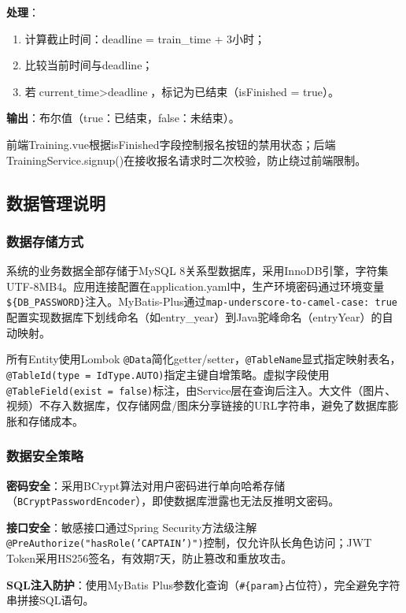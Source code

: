 \documentclass[12pt,a4paper]{ctexart}
\begin{document}
\textbf{处理}：
\begin{enumerate}[label=(\arabic*)]
\item 计算截止时间：deadline = train\_time + 3小时；
\item 比较当前时间与deadline；
\item 若$\text{current\_time} > \text{deadline}$，标记为已结束（isFinished = true）。
\end{enumerate}

\textbf{输出}：布尔值（true：已结束，false：未结束）。

前端Training.vue根据isFinished字段控制报名按钮的禁用状态；后端TrainingService.signup()在接收报名请求时二次校验，防止绕过前端限制。

\subsection{数据管理说明}

\subsubsection{数据存储方式}

系统的业务数据全部存储于MySQL 8关系型数据库，采用InnoDB引擎，字符集UTF-8MB4。应用连接配置在application.yaml中，生产环境密码通过环境变量\texttt{\$\{DB\_PASSWORD\}}注入。MyBatis-Plus通过\texttt{map-underscore-to-camel-case: true}配置实现数据库下划线命名（如entry\_year）到Java驼峰命名（entryYear）的自动映射。

所有Entity使用Lombok \texttt{@Data}简化getter/setter，\texttt{@TableName}显式指定映射表名，\texttt{@TableId(type = IdType.AUTO)}指定主键自增策略。虚拟字段使用\texttt{@TableField(exist = false)}标注，由Service层在查询后注入。大文件（图片、视频）不存入数据库，仅存储网盘/图床分享链接的URL字符串，避免了数据库膨胀和存储成本。

\subsubsection{数据安全策略}

\textbf{密码安全}：采用BCrypt算法对用户密码进行单向哈希存储（\texttt{BCryptPasswordEncoder}），即使数据库泄露也无法反推明文密码。

\textbf{接口安全}：敏感接口通过Spring Security方法级注解\texttt{@PreAuthorize("hasRole('CAPTAIN')")}控制，仅允许队长角色访问；JWT Token采用HS256签名，有效期7天，防止篡改和重放攻击。

\textbf{SQL注入防护}：使用MyBatis Plus参数化查询（\texttt{\#\{param\}}占位符），完全避免字符串拼接SQL语句。
\end{document}
